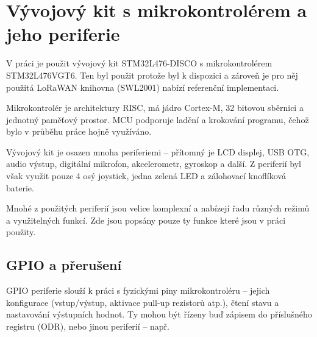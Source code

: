 \chapter{Vývojový kit s mikrokontrolérem a jeho periferie}

V práci je použit vývojový kit STM32L476-DISCO s mikrokontrolérem STM32L476VGT6.
Ten byl použit protože byl k dispozici a zároveň je pro něj použitá LoRaWAN knihovna (SWL2001) nabízí referenční implementaci.

Mikrokontrolér je architektury RISC, má jádro Cortex-M, 32 bitovou sběrnici a jednotný paměťový prostor. MCU podporuje ladění a krokování programu, čehož bylo v průběhu práce hojně využíváno.

Vývojový kit je osazen mnoha periferiemi -- přítomný je LCD displej, USB OTG, audio výstup, digitální mikrofon, akcelerometr, gyroskop a další. Z periferií byl však využit pouze 4 osý joystick, jedna zelená LED a zálohovací knoflíková baterie.

Mnohé z použitých periferií jsou velice komplexní a nabízejí řadu různých režimů a využitelných funkcí. Zde jsou popsány pouze ty funkce které jsou v práci použity.

\section{GPIO a přerušení}

GPIO periferie slouží k práci s fyzickými piny mikrokontroléru -- jejich konfigurace (vstup/výstup, aktivace pull-up rezistorů atp.), čtení stavu a nastavování výstupních hodnot. Ty mohou být řízeny buď zápisem do příslušného registru (ODR), nebo jinou periferií -- např. 